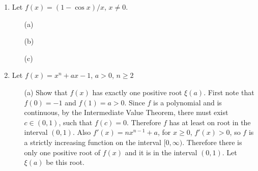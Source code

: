\documentclass[11pt]{article}
\begin{document}
\begin{enumerate}
    \item %
        Let $f(x) = (1 - \cos{x})/x$, $x \neq 0$.
        \begin{enumerate}
            \item[(a)]

            \item[(b)]
            \item[(c)]
        \end{enumerate}

    \item %
        Let $f(x) = x^n + ax - 1$, $a > 0$, $n \ge 2$
        \begin{enumerate}
            \item[(a)]
                Show that $f(x)$ has exactly one positive root $\xi(a)$.
                First note that $f(0) = -1$ and $f(1) = a > 0$.
                Since $f$ is a polynomial and is continuous, by the
                Intermediate Value Theorem, there must exist $c \in (0, 1)$,
                such that $f(c) = 0$.
                Therefore $f$ has at least on root in the interval $(0, 1)$.
                Also $f'(x) = nx^{n-1} + a$, for $x \ge 0$, $f'(x) > 0$, so
                $f$ is a strictly increasing function on the interval
                $[0, \infty)$.
                Therefore there is only one positive root of $f(x)$ and it is
                in the interval $(0, 1)$.
                Let $\xi(a)$ be this root.


\end{enumerate}
\end{enumerate}
\end{document}
